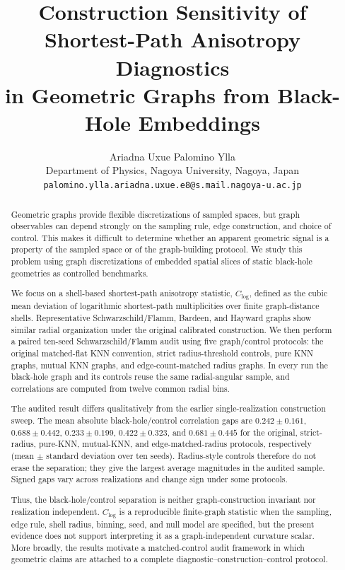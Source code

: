 \documentclass[11pt]{article}
\title{Construction Sensitivity of Shortest-Path Anisotropy Diagnostics\\
in Geometric Graphs from Black-Hole Embeddings}
\author{Ariadna Uxue Palomino Ylla\\
Department of Physics, Nagoya University, Nagoya, Japan\\
\texttt{palomino.ylla.ariadna.uxue.e8@s.mail.nagoya-u.ac.jp}}
\date{}
\newcommand{\clog}{C_{\log}}
\begin{document}
\maketitle

\begin{abstract}
Geometric graphs provide flexible discretizations of sampled spaces, but graph
observables can depend strongly on the sampling rule, edge construction, and
choice of control. This makes it difficult to determine whether an apparent
geometric signal is a property of the sampled space or of the graph-building
protocol. We study this problem using graph discretizations of embedded spatial
slices of static black-hole geometries as controlled benchmarks.

We focus on a shell-based shortest-path anisotropy statistic, $\clog$, defined
as the cubic mean deviation of logarithmic shortest-path multiplicities over
finite graph-distance shells. Representative Schwarzschild/Flamm, Bardeen, and
Hayward graphs show similar radial organization under the original calibrated
construction. We then perform a paired ten-seed Schwarzschild/Flamm audit using
five graph/control protocols: the original matched-flat KNN convention, strict
radius-threshold controls, pure KNN graphs, mutual KNN graphs, and
edge-count-matched radius graphs. In every run the black-hole graph and its
controls reuse the same radial-angular sample, and correlations are computed
from twelve common radial bins.

The audited result differs qualitatively from the earlier single-realization
construction sweep. The mean absolute black-hole/control correlation gaps are
$0.242\pm0.161$, $0.688\pm0.442$, $0.233\pm0.199$,
$0.422\pm0.323$, and $0.681\pm0.445$ for the original, strict-radius,
pure-KNN, mutual-KNN, and edge-matched-radius protocols, respectively
(mean $\pm$ standard deviation over ten seeds). Radius-style controls therefore
do not erase the separation; they give the largest average magnitudes in the
audited sample. Signed gaps vary across realizations and change sign under some
protocols.

Thus, the black-hole/control separation is neither graph-construction invariant
nor realization independent. $\clog$ is a reproducible finite-graph statistic
when the sampling, edge rule, shell radius, binning, seed, and null model are
specified, but the present evidence does not support interpreting it as a
graph-independent curvature scalar. More broadly, the results motivate a
matched-control audit framework in which geometric claims are attached to a
complete diagnostic--construction--control protocol.
\end{abstract}
\end{document}
